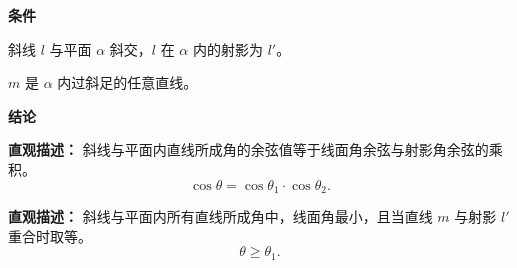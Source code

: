 \begin{statementbox}
	\textbf{\textcolor{CStatement}{条件}}
	\begin{description}[style=nextline, leftmargin=2.8em, labelsep=0.5em, itemsep=0.35em]
		\item[\textbf{\textcolor{CStatement}{条件1（斜线射影条件）：}}] 斜线 $l$ 与平面 $\alpha$ 斜交，$l$ 在 $\alpha$ 内的射影为 $l'$。
		\item[\textbf{\textcolor{CStatement}{条件2（任意直线条件）：}}] $m$ 是 $\alpha$ 内过斜足的任意直线。
	\end{description}
	\textbf{\textcolor{CStatement}{结论}}
	\begin{description}[style=nextline, leftmargin=2.8em, labelsep=0.5em, itemsep=0.45em]
		\item[\textbf{\textcolor{CStatement}{结论一（三余弦关系）：}}]
			\textbf{\textcolor{CStatement}{直观描述：}}
			斜线与平面内直线所成角的余弦值等于线面角余弦与射影角余弦的乘积。
			\[
				\cos\theta = \cos\theta_1 \cdot \cos\theta_2.
			\]
		\item[\textbf{\textcolor{CStatement}{推广结论（最小角性质）：}}]
			\textbf{\textcolor{CStatement}{直观描述：}}
			斜线与平面内所有直线所成角中，线面角最小，且当直线 $m$ 与射影 $l'$ 重合时取等。
			\[
				\theta \ge \theta_1.
			\]
	\end{description}
\end{statementbox}
